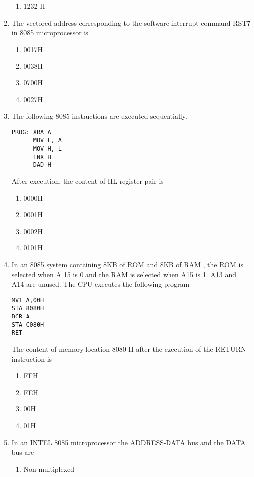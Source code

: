 \documentclass[journal,12pt,twocolumn]{IEEEtran}
\begin{document}
\begin{enumerate}
\begin{enumerate}
      \item 1232 H
    \end{enumerate}
    \item The vectored address corresponding to the software interrupt command RST7 in 8085
microprocessor is 
    \begin{enumerate}
      \item 0017H 
      \item 0038H
      \item 0700H
      \item 0027H
    \end{enumerate}
    \item The following 8085 instructions are executed sequentially.\\
\begin{verbatim}
PROG: XRA A
      MOV L, A
      MOV H, L
      INX H
      DAD H
\end{verbatim}
After execution, the content of HL register pair is\\
    \begin{enumerate}
      \item 0000H 
      \item 0001H
      \item 0002H
      \item 0101H
    \end{enumerate}
    \item In an 8085 system containing 8KB of ROM and 8KB of RAM , the ROM is selected when A 15
is 0 and the RAM is selected when A15 is 1. A13 and A14 are unused. The CPU executes the
following program\\
\begin{verbatim}
MV1 A,00H
STA 8080H
DCR A
STA C080H
RET
\end{verbatim}
The content of memory location 8080 H after the execution of the RETURN instruction is\\ 
    \begin{enumerate}
      \item FFH
      \item FEH
      \item 00H
      \item 01H
     \end{enumerate}
     \item In an INTEL 8085 microprocessor the ADDRESS-DATA bus and the DATA bus are\\
       \begin{enumerate}
      \item Non multiplexed

\end{enumerate}
\end{enumerate}
\end{document}
